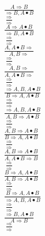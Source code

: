 \documentclass[11pt]{article}
\begin{document}
\begin{center}
\bigskip
\\$\frac{A\Rightarrow B}{\Rightarrow B, A\bullet B}$
\bigskip
\\$\frac{\Rightarrow }{\Rightarrow }$
\bigskip
\\$\frac{A\Rightarrow A\bullet B}{\Rightarrow B, A\bullet B}$
\bigskip
\\$\frac{\Rightarrow }{\Rightarrow }$
\bigskip
\\$\frac{A, A\bullet B\Rightarrow }{A, B\Rightarrow }$
\bigskip
\\$\frac{\Rightarrow }{\Rightarrow }$
\bigskip
\\$\frac{A, B\Rightarrow }{A, A\bullet B\Rightarrow }$
\bigskip
\\$\frac{\Rightarrow }{\Rightarrow }$
\bigskip
\\$\frac{\Rightarrow A, B, A\bullet B}{B\Rightarrow A, A\bullet B}$
\bigskip
\\$\frac{\Rightarrow }{\Rightarrow }$
\bigskip
\\$\frac{\Rightarrow A, B, A\bullet B}{A, B\Rightarrow A\bullet B}$
\bigskip
\\$\frac{\Rightarrow }{\Rightarrow }$
\bigskip
\\$\frac{A, B\Rightarrow A\bullet B}{B\Rightarrow A, A\bullet B}$
\bigskip
\\$\frac{\Rightarrow }{\Rightarrow }$
\bigskip
\\$\frac{A, B\Rightarrow A\bullet B}{A, A\bullet B\Rightarrow B}$
\bigskip
\\$\frac{\Rightarrow }{\Rightarrow }$
\bigskip
\\$\frac{B\Rightarrow A, A\bullet B}{A, B\Rightarrow A\bullet B}$
\bigskip
\\$\frac{\Rightarrow }{\Rightarrow }$
\bigskip
\\$\frac{B\Rightarrow A, A\bullet B}{\Rightarrow A, B, A\bullet B}$
\bigskip
\\$\frac{\Rightarrow }{\Rightarrow }$
\bigskip
\\$\frac{\Rightarrow B, A\bullet B}{A\Rightarrow B}$
\bigskip
\\$\frac{\Rightarrow }{\Rightarrow }$
\bigskip
\\
\end{center}
\end{document}
